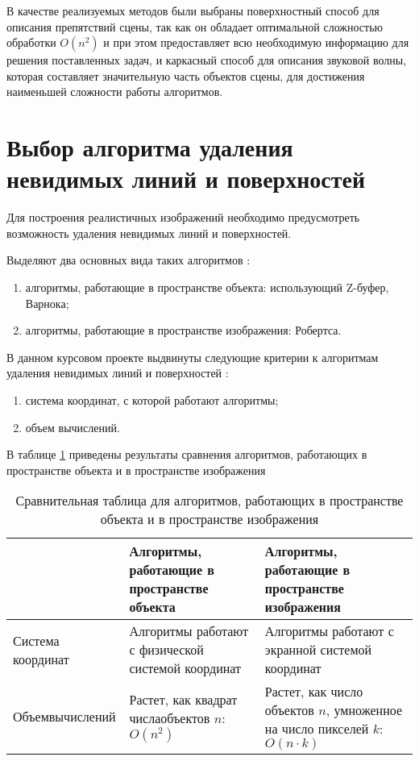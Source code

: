 В качестве реализуемых методов были выбраны поверхностный способ для описания препятствий сцены, так как он обладает оптимальной сложностью обработки $O(n^2)$ и при этом предоставляет всю необходимую информацию для решения поставленных задач, и каркасный способ для описания звуковой волны, которая составляет значительную часть объектов сцены, для достижения наименьшей сложности работы алгоритмов.

\clearpage

\section{Выбор алгоритма удаления невидимых линий и поверхностей}

Для построения реалистичных изображений необходимо предусмотреть возможность удаления невидимых линий и поверхностей.

Выделяют два основных вида таких алгоритмов \cite{invisible1}:
\begin{enumerate}
	\item алгоритмы, работающие в пространстве объекта: использующий Z-буфер, Варнока;
	\item алгоритмы, работающие в пространстве изображения: Робертса.
\end{enumerate}

В данном курсовом проекте выдвинуты следующие критерии к алгоритмам удаления невидимых линий и поверхностей \cite{compareInvisible1}:
\begin{enumerate}
	\item система координат, с которой работают алгоритмы;
	\item объем вычислений.
\end{enumerate}

В таблице \ref{table:compareInvisible} приведены результаты сравнения алгоритмов, работающих в пространстве объекта и в пространстве изображения \cite{compareInvisible1}
\begin{table}[h!]
	\begin{center}
		\caption{\label{table:compareInvisible} Сравнительная таблица для алгоритмов, работающих в пространстве объекта и в пространстве изображения}
		\begin{tabular}{|p{70pt}|p{190pt}|p{190pt}|}
			\hline
			~ & Алгоритмы, работающие в пространстве объекта & Алгоритмы, работающие в пространстве изображения \\ \hline
			Система координат & Алгоритмы работают с физической системой координат & Алгоритмы работают с экранной системой координат \\ \hline
			Объем\newline вычислений & Растет, как квадрат числа\newline объектов $n$: $O(n^2)$ & Растет, как число объектов $n$, умноженное на число пикселей $k$: $O(n \cdot k)$ \\ \hline
		\end{tabular}
	\end{center}
\end{table}

